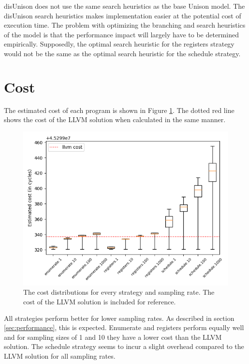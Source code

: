 disUnison does not use the same search heuristics as the base Unison model. The disUnison
search heuristics makes implementation easier at the potential cost of execution time. The
problem with optimizing the branching and search heuristics of the model is that the
performance impact will largely have to be determined empirically. Supposedly, the optimal
search heuristic for the registers strategy would not be the same as the optimal search
heuristic for the schedule strategy.

\section{Cost}

The estimated cost of each program is shown in Figure \ref{fig:cost}. The dotted red line
shows the cost of the LLVM solution when calculated in the same manner.

\begin{figure}[h]
	\centering
	\includegraphics[width=\textwidth,height=0.5\textheight]{results/figures/cost}
	\caption{The cost distributions for every strategy and sampling rate. The cost of the LLVM solution is included for reference.}
	\label{fig:cost}
\end{figure}

All strategies perform better for lower sampling rates. As described in section
\ref{sec:performance}, this is expected. Enumerate and registers perform equally well and
for sampling sizes of 1 and 10 they have a lower cost than the LLVM solution. The schedule
strategy seems to incur a slight overhead compared to the LLVM solution for all sampling
rates.


